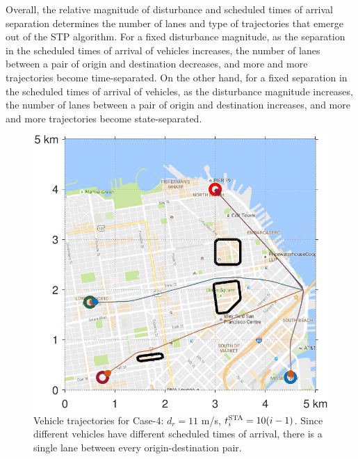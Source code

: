Overall, the relative magnitude of disturbance and scheduled times of arrival separation determines the number of lanes and type of trajectories that emerge out of the STP algorithm. For a fixed disturbance magnitude, as the separation in the scheduled times of arrival of vehicles increases, the number of lanes between a pair of origin and destination decreases, and more and more trajectories become time-separated. On the other hand, for a fixed separation in the scheduled times of arrival of vehicles, as the disturbance magnitude increases, the number of lanes between a pair of origin and destination increases, and more and more trajectories become state-separated.

\begin{figure}[H]
  \centering
  \includegraphics[width=\columnwidth]{figs/sf_d11sep10}
  \caption{Vehicle trajectories for Case-4: $d_r = 11$ m/s, $t^\text{STA}_i = 10(i-1)$. Since different vehicles have different scheduled times of arrival, there is a single lane between every origin-destination pair.} 
  \label{fig:sf_d11sep10}
\end{figure}